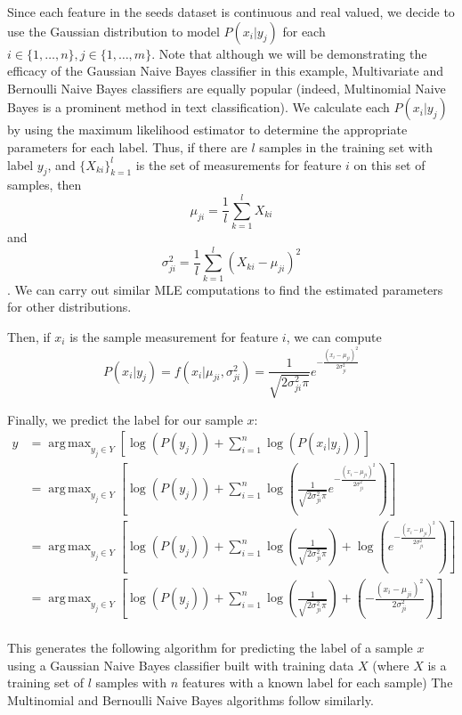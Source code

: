 \documentclass[12pt]{article}
\newcommand{\p}[1]{\left(#1\right)}
\newcommand{\brac}[1]{\left[ #1 \right]}
\DeclareMathOperator*{\argmax}{\arg\,max}
\begin{document}
Since each feature in the seeds dataset is continuous and real valued, we decide to use the Gaussian distribution to model $P(x_i| y_j)$ for each $i \in \{1, \ldots, n\}, j \in \{1, \ldots, m\}$.
Note that although we will be demonstrating the efficacy of the Gaussian Naive Bayes classifier in this example, Multivariate and Bernoulli Naive Bayes classifiers are equally popular (indeed, Multinomial Naive Bayes is a prominent method in text classification).
We calculate each $P(x_i | y_j)$ by using the maximum likelihood estimator to determine the appropriate parameters for each label.
Thus, if there are $l$ samples in the training set with label $y_j$, and $\{X_{ki}\}_{k=1}^l$ is the set of measurements for feature $i$ on this set of samples, then $$\mu_{ji} = \frac{1}{l} \sum_{k=1}^l X_{ki}$$ and $$\sigma^2_{ji} = \frac{1}{l} \sum_{k=1}^l (X_{ki} - \mu_{ji})^2$$.
We can carry out similar MLE computations to find the estimated parameters for other distributions. 

Then, if $x_i$ is the sample measurement for feature $i$, we can compute  $$P(x_i | y_j) = f(x_i | \mu_{ji}, \sigma^2_{ji}) = \frac{1}{\sqrt{2 \sigma_{ji}^2 \pi}} e^{-\frac{(x_i - \mu_{ji})^2}{2 \sigma_{ji}^2}}$$

Finally, we predict the label for our sample $x$: 
\begin{align*}
y &= \argmax_{y_j \in Y}\brac{\log(P(y_j)) + \sum_{i=1}^n \log(P(x_i|y_j))}\\
&= \argmax_{y_j \in Y}\brac{\log(P(y_j)) + \sum_{i=1}^n \log\p{\frac{1}{\sqrt{2 \sigma_{ji}^2 \pi}} e^{-\frac{(x_i - \mu_{ji})^2}{2 \sigma_{ji}^2}}}}\\
&= \argmax_{y_j \in Y}\brac{\log(P(y_j)) + \sum_{i=1}^n \log\p{\frac{1}{\sqrt{2 \sigma_{ji}^2 \pi}}} + \log \p{ e^{-\frac{(x_i - \mu_{ji})^2}{2 \sigma_{ji}^2}}}}\\
&= \argmax_{y_j \in Y}\brac{\log(P(y_j)) + \sum_{i=1}^n \log\p{\frac{1}{\sqrt{2 \sigma_{ji}^2 \pi}}} +  \p{-\frac{(x_i - \mu_{ji})^2}{2 \sigma_{ji}^2}}}\\
\end{align*}

This generates the following algorithm for predicting the label of a sample $x$ using a Gaussian Naive Bayes classifier built with training data $X$ (where $X$ is a training set of $l$ samples with $n$ features with a known label for each sample)
The Multinomial and Bernoulli Naive Bayes algorithms follow similarly.
\end{document}
